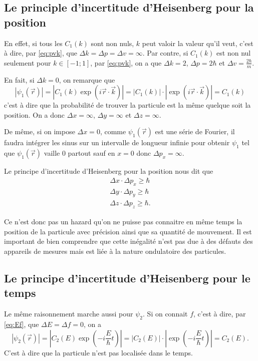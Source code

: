 \subsection{Le principle d'incertitude d'Heisenberg pour la position}
En effet, si tous les $C_1(k)$ sont non nuls,
$k$ peut valoir la valeur qu'il veut,
c'est à dire, par \eqref{eq:pvk}, que
$\Delta k = \Delta p = \Delta v = \infty$.
Par contre, si $C_1(k)$ est non nul seulement
pour $k \in [-1;1]$, par \eqref{eq:pvk}, on a que
$\Delta k = 2$, $\Delta p = 2\hbar$ et $\Delta v = \frac{2\hbar}{m}$.

En fait, si $\Delta k = 0$, on remarque que
\[ |\psi_1(\vec{r})|
= \left|C_1(k) \exp\left(i\vec{r} \cdot \vec{k}\right)\right|
= \left|C_1(k)\right|\cdot\left|\exp\left(i\vec{r} \cdot \vec{k}\right)\right|
= C_1(k) \]
c'est à dire que la probabilité de trouver la particule est la même
quelque soit la position.
On a donc $\Delta x = \infty$, $\Delta y = \infty$ et $\Delta z = \infty$.

De même, si on impose $\Delta x = 0$, comme $\psi_1(\vec{r})$ est une
série de Fourier, il faudra intégrer les sinus
sur un intervalle de longueur infinie pour obtenir
$\psi_1$ tel que $\psi_1(\vec{r})$ vaille 0 partout sauf en $x = 0$ donc
$\Delta p_x = \infty$.

Le principe d'incertitude d'Heisenberg pour la position nous dit que
\begin{align*}
  \Delta x \cdot \Delta p_x \geq \hbar\\
  \Delta y \cdot \Delta p_y \geq \hbar\\
  \Delta z \cdot \Delta p_z \geq \hbar.
\end{align*}

Ce n'est donc pas un hazard qu'on ne puisse pas connaitre en même temps
la position de la particule avec précision ainsi que sa quantité de mouvement.
Il est important de bien comprendre que cette inégalité n'est pas due
à des défauts des appareils de mesures mais est liée à la nature
ondulatoire des particules.

\subsection{Le principe d'incertitude d'Heisenberg pour le temps}
Le même raisonnement marche aussi pour $\psi_2$.
Si on connait $f$, c'est à dire, par \eqref{eq:Ef},
que $\Delta E = \Delta f = 0$, on a
\[ |\psi_2(\vec{r})|
= \left|C_2(E) \exp\left(-i\frac{E}{\hbar}t\right)\right|
= \left|C_2(E)\right|\cdot\left|\exp\left(-i\frac{E}{\hbar}t\right)\right|
= C_2(E). \]
C'est à dire que la particule n'est pas localisée dans le temps.

